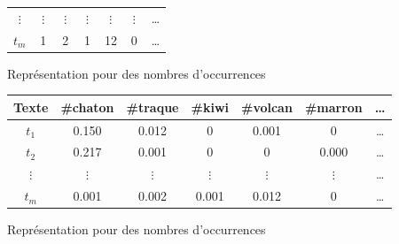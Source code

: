 \documentclass[../allslides.tex]{subfiles}
\begin{document}
\begin{frame}
\begin{overprint}
\begin{figure}
\begin{tabular}{c*{5}{S[table-format=4.0]}c}
					\(⋮\)	& \multicolumn{1}{c}{\(⋮\)}	& 	& 	& 	& 	& …\\
					\(t_m\)	& 1	& 2	& 1	& 12	& 0	& …\\
					\bottomrule
				\end{tabular}
				\caption{Représentation pour des nombres d'occurrences}
			\end{figure}
		\onslide<4>
			\begin{figure}
				\begin{tabular}{c*{5}{S}c}
					\toprule
					\textbf{Texte}	& {\textbf{\#chaton}}	& {\textbf{\#traque}}	& {\textbf{\#kiwi}}	& {\textbf{\#volcan}}	& {\textbf{\#marron}}	& {…}\\
					\midrule
					\(t_1\)	& 0.150	& 0.012	& 0	& 0.001	& 0	& …\\
					\(t_2\)	& 0.217	& 0.001	& 0	& 0	& 0.000	& …\\
					\(⋮\)	& 	& 	& 	& 	& 	& …\\
					\(t_m\)	& 0.001	& 0.002	& 0.001	& 0.012	& 0	& …\\
					\bottomrule
				\end{tabular}
				\caption{Représentation pour des nombres d'occurrences}
			\end{figure}
	\end{overprint}
\end{frame}

\end{document}
